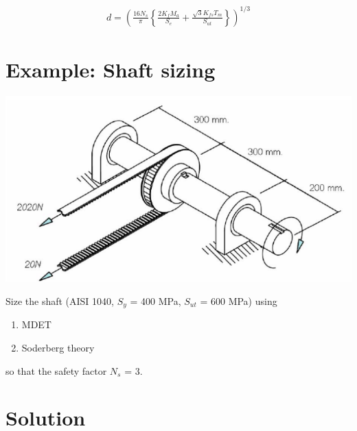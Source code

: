 \documentclass[a4paper,openany]{tufte-book}
\begin{document}
\begin{align}
  d = \left( \frac{16N_s}{\pi} \left\{ \frac{2 K_f M_a}{S_e} + \frac{\sqrt{3} K_{fs} T_m}{S_{ut}} \right\} \right)^{1/3}\end{align}

\section{Example: Shaft sizing}
\label{sec:org96bc609}

\begin{center}
\includegraphics[width=.9\linewidth]{./pictures/Shafts/shaft-sizing.png}
\end{center}

Size the shaft (AISI 1040, \(S_{y}\) = 400 MPa, \(S_{ut}\) = 600 MPa)
using

\begin{enumerate}
\item MDET

\item Soderberg theory
\end{enumerate}

so that the safety factor \(N_{s}\) = 3.

\section{Solution}
\label{sec:org3c0d11d}
\end{document}
